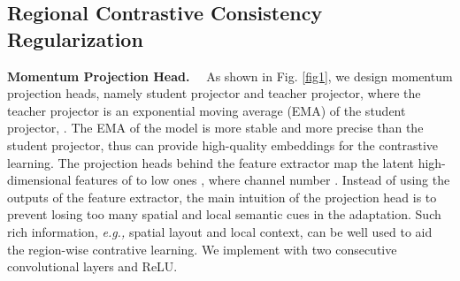 \documentclass{article}
\renewcommand{\paragraph}[1]{\noindent\textbf{#1}~~}
\begin{document}
\subsection{Regional Contrastive Consistency Regularization}
\label{sec:3.2}

\paragraph{Momentum Projection Head.}
As shown in Fig. \ref{fig1}, we design momentum projection heads, namely student projector and teacher projector, where the teacher projector is an exponential moving average (EMA) of the student projector, . The EMA of the model is more stable and more precise than the student projector, thus can provide high-quality embeddings for the contrastive learning.
The projection heads 
behind the feature extractor  map the latent high-dimensional features  of  to low ones , where channel number . 
Instead of using the outputs  of the feature extractor, the main intuition of the projection head is to prevent losing too many  spatial and local semantic cues in the adaptation. Such rich information, \emph{e.g.,}  spatial layout and local context, can be well used to aid the region-wise contrative learning.
We implement  with two consecutive convolutional layers and ReLU. 
\end{document}
